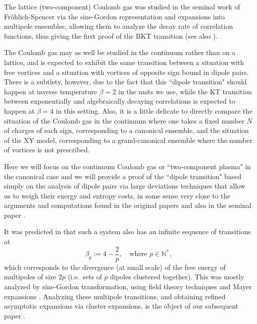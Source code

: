 \documentclass[a4paper,10pt,leqno]{amsart}
\numberwithin{equation}{section}
\begin{document}
The lattice (two-component) Coulomb gas was studied in the seminal work of Fr\"ohlich-Spencer \cite{frohlichspencer} via the sine-Gordon representation and expansions into multipole ensembles, allowing them to analyze the decay rate of correlation functions, thus giving the first proof of the BKT transition (see also \cite{mcbryanspencer,mkp1,mkp2}).

The Coulomb gas may as well be studied in the continuum rather than on a lattice, and is expected to exhibit the same transition between a situation with free vortices and a situation with vortices of opposite sign bound in dipole pairs. There is a subtlety, however, due to the fact that this ``dipole transition" should happen at inverse temperature $\beta=2$ in the units we use, while the KT transition between exponentially and algebraically decaying correlations is expected to happen at $\beta=4$ in this setting. Also, it is a little delicate to directly compare the situation of the Coulomb gas in the continuum where one takes a fixed number $N$ of charges of each sign, corresponding to a canonical ensemble, and the situation of the XY model, corresponding to a grand-canonical ensemble where the number of vortices is not prescribed.

Here we will focus on the continuum Coulomb gas or ``two-component plasma" in the canonical case and we will provide a proof of the ``dipole transition" based simply on the analysis of dipole pairs via large deviations techniques that allow us to weigh their energy and entropy costs, in some sense very close to the arguments and computations found in the original papers \cite{Kosterlitz1973,Kosterlitz1974} and also in the seminal paper \cite{GunPan}.

It was predicted in \cite{frohlichspencer,BenfattoGallavottiNicolo,GallavottiNicolo} that such a system also has an infinite sequence of transitions at
\begin{equation*}\beta_p := 4 - \frac{2}{p},\quad \text{where $p\in \mathbb{N}^*$}, \end{equation*}
which corresponds to the divergence (at small scale) of the free energy of multipoles of size $2p$ (i.e.~sets of $p$ dipoles clustered together).
This was mostly analyzed by sine-Gordon transformation, using field theory techniques and Mayer expansions \cite{frohlichspencer,BenfattoGallavottiNicolo,GallavottiNicolo,dimockhurd}. Analyzing these multipole transitions, and obtaining refined asymptotic expansions via cluster expansions, is the object of our subsequent paper \cite{BS2}.
\end{document}
